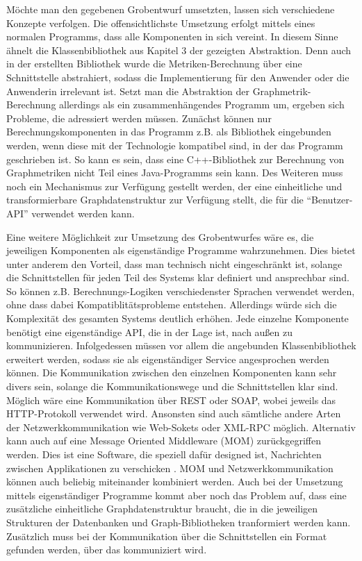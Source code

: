 \documentclass[a4paper,12pt,ngerman,chapterprefix=false,listof=totoc,bibliography=totoc]{scrreprt}
\begin{document}
{{{Möchte man den gegebenen Grobentwurf umsetzten, lassen sich verschiedene Konzepte verfolgen. Die offensichtlichste Umsetzung erfolgt mittels eines normalen Programms, dass alle Komponenten in sich vereint. In diesem Sinne ähnelt die Klassenbibliothek aus Kapitel 3 der gezeigten Abstraktion. Denn auch in der erstellten Bibliothek wurde die Metriken-Berechnung über eine Schnittstelle abstrahiert, sodass die Implementierung für den Anwender oder die Anwenderin irrelevant ist. Setzt man die Abstraktion der Graphmetrik-Berechnung allerdings als ein zusammenhängendes Programm um, ergeben sich Probleme, die adressiert werden müssen. Zunächst können nur Berechnungskomponenten in das Programm z.B. als Bibliothek eingebunden werden, wenn diese mit der Technologie kompatibel sind, in der das Programm geschrieben ist. So kann es sein, dass eine C++-Bibliothek zur Berechnung von Graphmetriken nicht Teil eines Java-Programms sein kann. Des Weiteren muss noch ein Mechanismus zur Verfügung gestellt werden, der eine einheitliche und transformierbare Graphdatenstruktur zur Verfügung stellt, die für die "`Benutzer-API"' verwendet werden kann.

Eine weitere Möglichkeit zur Umsetzung des Grobentwurfes wäre es, die jeweiligen Komponenten als eigenständige Programme wahrzunehmen. Dies bietet unter anderem den Vorteil, dass man technisch nicht eingeschränkt ist, solange die Schnittstellen für jeden Teil des Systems klar definiert und ansprechbar sind. So können z.B. Berechnungs-Logiken verschiedenster Sprachen verwendet werden, ohne dass dabei Kompatiblitätsprobleme entstehen. Allerdings würde sich die Komplexität des gesamten Systems deutlich erhöhen. Jede einzelne Komponente benötigt eine eigenständige API, die in der Lage ist, nach außen zu kommunizieren. Infolgedessen müssen vor allem die angebunden Klassenbibliothek erweitert werden, sodass sie als eigenständiger Service angesprochen werden können. Die Kommunikation zwischen den einzelnen Komponenten kann sehr divers sein, solange die Kommunikationswege und die Schnittstellen klar sind. Möglich wäre eine Kommunikation über REST oder SOAP, wobei jeweils das HTTP-Protokoll verwendet wird. Ansonsten sind auch sämtliche andere Arten der Netzwerkkommunikation wie Web-Sokets oder XML-RPC möglich. \cite{balzert_lehrbuch_2011} Alternativ kann auch auf eine Message Oriented Middleware (MOM) zurückgegriffen werden. Dies ist eine Software, die speziell dafür designed ist, Nachrichten zwischen Applikationen zu verschicken \cite{curry_message-oriented_2005}. MOM und Netzwerkkommunikation können auch beliebig miteinander kombiniert werden. Auch bei der Umsetzung mittels eigenständiger Programme kommt aber noch das Problem auf, dass eine zusätzliche einheitliche Graphdatenstruktur braucht, die in die jeweiligen Strukturen der Datenbanken und Graph-Bibliotheken tranformiert werden kann. Zusätzlich muss bei der Kommunikation über die Schnittstellen ein Format gefunden werden, über das kommuniziert wird.
}
}}
\end{document}
